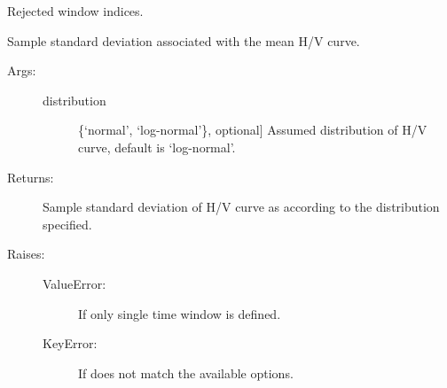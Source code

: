 \documentclass[letterpaper,10pt,english,openany,oneside]{sphinxmanual}
\begin{document}
\begin{fulllineitems}
\begin{fulllineitems}
\begin{description}
\begin{description}
\end{description}

\end{description}

\end{fulllineitems}


\begin{fulllineitems}
\label{\detokenize{index:hvsrpy.Hvsr.rejected_window_indices}}
Rejected window indices.

\end{fulllineitems}


\begin{fulllineitems}
\label{\detokenize{index:hvsrpy.Hvsr.std_curve}}
Sample standard deviation associated with the mean H/V curve.
\begin{description}
\item[{Args:}] \leavevmode\begin{description}
\item[{distribution}] \leavevmode{[}\{‘normal’, ‘log-normal’\}, optional{]}
Assumed distribution of H/V curve, default is
‘log-normal’.

\end{description}

\item[{Returns:}] \leavevmode
Sample standard deviation of H/V curve as 
according to the distribution specified.

\item[{Raises:}] \leavevmode\begin{description}
\item[{ValueError:}] \leavevmode
If only single time window is defined.

\item[{KeyError:}] \leavevmode
If  does not match the available options.

\end{description}

\end{description}


\end{fulllineitems}
\end{fulllineitems}
\end{document}
